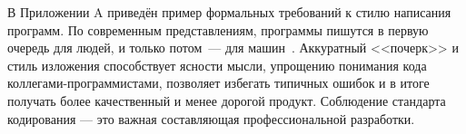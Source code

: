 
В Приложении A приведён пример формальных требований к стилю написания программ. По современным
представлениям, программы пишутся в первую очередь для людей, и только потом~--- для
машин~\cite{mcconnel2015code}. Аккуратный <<почерк>> и стиль изложения способствует ясности мысли,
упрощению понимания кода коллегами-программистами, позволяет избегать типичных ошибок и в итоге
получать более качественный и менее дорогой продукт. Соблюдение стандарта кодирования --- это важная составляющая
профессиональной разработки.
